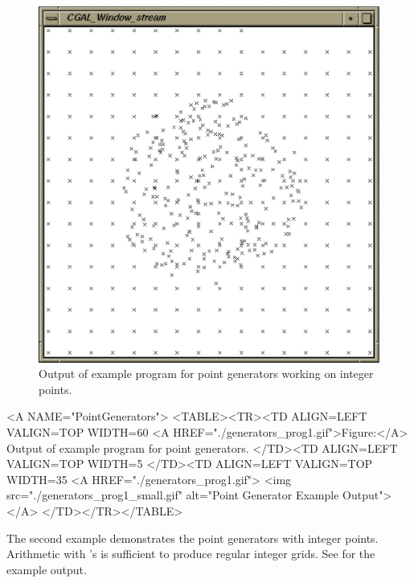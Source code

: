 \begin{ccTexOnly}
\begin{figure}
\begin{minipage}{0.45\textwidth}
      \includegraphics[width=\textwidth]{generators_prog2.ps}
      \caption{Output of example program for point generators working
        on integer points.}
      \label{figureIntegerPointGenerator}
    \end{minipage}%
  \end{figure}
\end{ccTexOnly}

\begin{ccHtmlOnly}
  <A NAME="PointGenerators">
  <TABLE><TR><TD ALIGN=LEFT VALIGN=TOP WIDTH=60%
    <A HREF="./generators_prog1.gif">Figure:</A>
    Output of example program for point generators.
  </TD><TD ALIGN=LEFT VALIGN=TOP WIDTH=5%
  </TD><TD ALIGN=LEFT VALIGN=TOP WIDTH=35%
    <A HREF="./generators_prog1.gif">
        <img src="./generators_prog1_small.gif" 
             alt="Point Generator Example Output"></A>
  </TD></TR></TABLE>
\end{ccHtmlOnly}

\newpage

The second example demonstrates the point generators with integer
points. Arithmetic with 's is sufficient to produce
regular integer grids. See 
for the example output.


